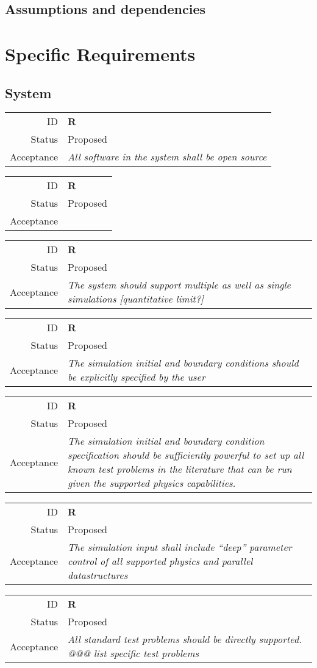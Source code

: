 \documentclass{book}
\newcommand{\req}[3]{
\begin{tabular}{rl}
ID & \textbf{R#1} \\
Status & \textsf{#2} \\
Acceptance & \textit{#3}
\end{tabular}
}
\begin{document}
\section{Assumptions and dependencies}

\chapter{Specific Requirements} \label{c:req}

\section{System}

\req
  {}
  {Proposed}
%
  {All software in the system shall be open source}

\req
  {}
  {Proposed}
%
  {}


\req
  {}
  {Proposed}
%
  {The system should support multiple as well as single simulations
  [quantitative limit?]}

\req
  {}
  {Proposed}
%
  {The simulation initial and boundary conditions should be explicitly
  specified by the user}

\req
  {}
  {Proposed}
%
  {The simulation initial and boundary condition specification should
  be sufficiently powerful to set up all known test problems in the
  literature that can be run given the supported physics
  capabilities.}

\req
  {}
  {Proposed}
%
  {The simulation input shall include ``deep'' parameter control of
  all supported physics and parallel datastructures}

\req
  {}
  {Proposed}
%
  {All standard test problems should be directly supported.  @@@ list
  specific test problems}
\end{document}

